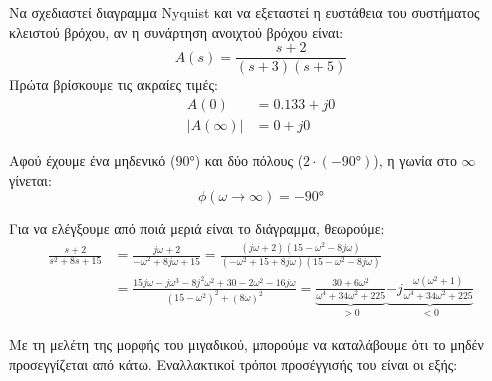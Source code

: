 \documentclass[11pt,a4paper,notitlepage,fleqn]{article}
\begin{document}
\begin{exercise}
Να σχεδιαστεί διαγραμμα Nyquist και να εξεταστεί η ευστάθεια του συστήματος κλειστού βρόχου, αν η συνάρτηση ανοιχτού βρόχου είναι:
\[
A(s) = \frac{s+2}{(s+3)(s+5)}
\]
\tcblower
Πρώτα βρίσκουμε τις ακραίες τιμές:
\begin{align*}
	A(0) &= 0.133 + j0 \\
	\left|A(\infty)\right| &= 0 + j0
\end{align*}

Αφού έχουμε ένα μηδενικό (\( \ang{+90} \)) και δύο πόλους (\( 2\cdot(\ang{-90}) \)), η γωνία στο \( \infty \) γίνεται:
\[
\phi(\omega\to\infty) = \ang{-90}
\]

Για να ελέγξουμε από ποιά μεριά είναι το διάγραμμα, θεωρούμε:
\begin{align*}
\frac{s+2}{s^2+8s+15} &= \frac{j\omega+2}{-\omega^2+8j\omega+15} = \frac{(j\omega+2)(15-\omega^2-8j\omega)}{(-\omega^2+15+8j\omega)(15-\omega^2-8j\omega)}\\
&=\frac{15j\omega-j\omega^3-8j^2\omega^2+30-2\omega^2-16j\omega}{(15-\omega^2)^2+(8\omega)^2}
=\underbrace{\frac{30+6\omega^2}{\omega^4+34\omega^2+225}}_{>0}
\underbrace{-j\frac{\omega(\omega^2+1)}{\omega^4+34\omega^2+225}}_{<0}
\end{align*}

Με τη μελέτη της μορφής του μιγαδικού, μπορούμε να καταλάβουμε ότι το μηδέν προσεγγίζεται από κάτω. Εναλλακτικοί τρόποι
προσέγγισής του είναι οι εξής:

\end{exercise}
\end{document}
